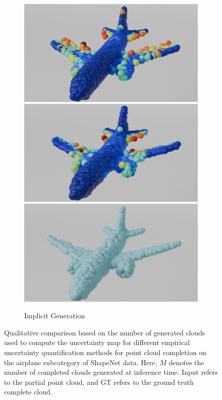 \begin{figure}[htb]
\begin{subfigure}[t]{0.315\textwidth}
            \includegraphics[width=\textwidth]{figures/25z_ap_imle.png}
            \includegraphics[width=\textwidth]{figures/50z_ap_imle.png}
            \includegraphics[width=\textwidth]{figures/comp_ap.png}
            \caption{Implicit Generation}
          \end{subfigure}
          \caption{Qualitative comparison based on the number of generated clouds used to compute the uncertainty map for different empirical uncertainty quantification methods for point cloud completion on the airplane subcategory of ShapeNet data. Here, $M$ denotes the number of completed clouds generated at inference time. Input refers to the partial point cloud, and GT refers to the ground truth complete cloud.}
          \label{fig:zairplanezz}
        \end{figure}
        \newline

